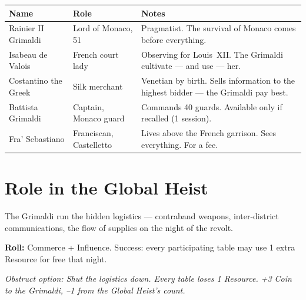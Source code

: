 \begin{center}
\begin{tabularx}{\textwidth}{L{2.8cm} L{2.8cm} X}
  \toprule
  \textbf{Name} & \textbf{Role} & \textbf{Notes} \\
  \midrule
  Rainier II Grimaldi & Lord of Monaco, 51   & Pragmatist. The survival of Monaco comes before everything. \\
  Isabeau de Valois   & French court lady    & Observing for Louis~XII. The Grimaldi cultivate --- and use --- her. \\
  Costantino the Greek& Silk merchant        & Venetian by birth. Sells information to the highest bidder --- the Grimaldi pay best. \\
  Battista Grimaldi   & Captain, Monaco guard& Commands 40 guards. Available only if recalled (1 session). \\
  Fra' Sebastiano     & Franciscan, Castelletto & Lives above the French garrison. Sees everything. For a fee. \\
  \bottomrule
\end{tabularx}
\end{center}

\section{Role in the Global Heist}

The Grimaldi run the hidden logistics --- contraband weapons, inter-district
communications, the flow of supplies on the night of the revolt.

\textbf{Roll:} Commerce + Influence. Success: every participating table may
use 1 extra Resource for free that night.

\textit{Obstruct option: Shut the logistics down. Every table loses 1 Resource.
+3 Coin to the Grimaldi, --1 from the Global Heist's count.}
